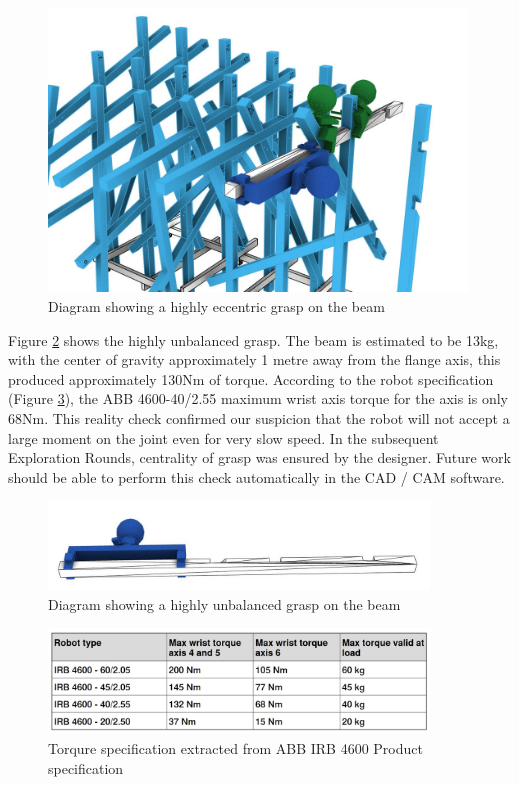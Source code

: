 \begin{figure}[!h]
    \centering
    \includegraphics[width=0.99\textwidth]{images/05/image62.jpg}
    \caption{Diagram showing a highly eccentric grasp on the beam}
    \label{fig:ecentric-grip}
\end{figure}

\FloatBarrier

Figure \ref{fig:unbalanced-grasp} shows the highly unbalanced grasp. The beam is estimated to be 13kg, with the center of gravity approximately 1 metre away from the flange axis, this produced approximately 130Nm of torque. According to the robot specification (Figure \ref{fig:torque-spec-abb}), the ABB 4600-40/2.55 maximum wrist axis torque for the axis is only 68Nm. This reality check confirmed our suspicion that the robot will not accept a large moment on the joint even for very slow speed. In the subsequent Exploration Rounds, centrality of grasp was ensured by the designer. Future work should be able to perform this check automatically in the CAD / CAM software.

\begin{figure}[!h]
    \centering
    \includegraphics[width=0.90\textwidth]{images/05/image90.jpg}
    \caption{Diagram showing a highly unbalanced grasp on the beam}
    \label{fig:unbalanced-grasp}
\end{figure}

\begin{figure}[!h]
    \centering
    \includegraphics[width=0.90\textwidth]{images/05/image23.jpg}
    \caption{Torqure specification extracted from ABB IRB 4600 Product specification}
    \label{fig:torque-spec-abb}
\end{figure}

